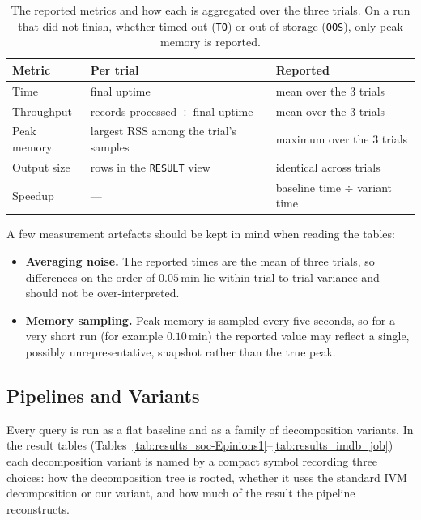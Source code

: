 \begin{table}[H]
  \centering
  \begin{tabular}{@{}lll@{}}
    \toprule
    \textbf{Metric} & \textbf{Per trial} & \textbf{Reported} \\
    \midrule
    Time        & final uptime                          & mean over the 3 trials \\
    Throughput  & records processed $\div$ final uptime  & mean over the 3 trials \\
    Peak memory & largest RSS among the trial's samples  & maximum over the 3 trials \\
    Output size & rows in the \texttt{RESULT} view       & identical across trials \\
    Speedup     & ---                                    & baseline time $\div$ variant time \\
    \bottomrule
  \end{tabular}
  \caption{The reported metrics and how each is aggregated over the three trials. On a run that did not finish, whether timed out (\texttt{TO}) or out of storage (\texttt{OOS}), only peak memory is reported.}
  \label{tab:metrics}
\end{table}

\medskip
\label{sec:caveats}
A few measurement artefacts should be kept in mind when reading the tables:
\begin{itemize}
    \item \textbf{Averaging noise.} The reported times are the mean of three trials, so differences on the order of $0.05$\,min lie within trial-to-trial variance and should not be over-interpreted.
    \item \textbf{Memory sampling.} Peak memory is sampled every five seconds, so for a very short run (for example $0.10$\,min) the reported value may reflect a single, possibly unrepresentative, snapshot rather than the true peak.
\end{itemize}

\subsection{Pipelines and Variants}
\label{sec:variants}

Every query is run as a flat baseline and as a family of decomposition variants. In the result tables (Tables~\ref{tab:results_soc-Epinions1}--\ref{tab:results_imdb_job}) each decomposition variant is named by a compact symbol recording three choices: how the decomposition tree is rooted, whether it uses the standard IVM$^+$ decomposition or our variant, and how much of the result the pipeline reconstructs.

